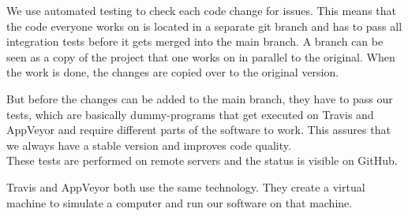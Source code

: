 We use automated testing to check each code change for issues. This means that the code everyone works on is located in a separate git branch \cite{gitbranch} and has to pass all integration tests before it gets merged into the main branch. A branch can be seen as a copy of the project that one works on in parallel to the original. When the work is done, the changes are copied over to the original version.

But before the changes can be added to the main branch, they have to pass our tests, which are basically dummy-programs that get executed on Travis and AppVeyor and require different parts of the software to work. This assures that we always have a stable version and improves code quality. \\
These tests are performed on remote servers and the status is visible on GitHub. \cite{githubci}

Travis and AppVeyor both use the same technology. They create a virtual machine to simulate a computer and run our software on that machine.
